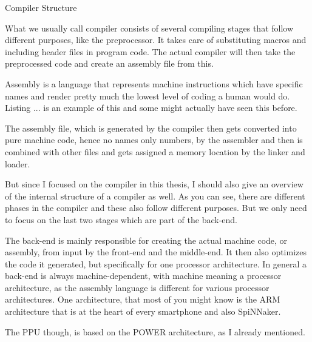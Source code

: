 \documentclass[10pt,aspectratio=169]{beamer}
\begin{document}
\begin{frame}[fragile]{Compiler Structure}
{		What we usually call compiler consists of several compiling stages that follow different purposes, like the preprocessor.
		It takes care of substituting macros and including header files in program code.
		The actual compiler will then take the preprocessed code and create an assembly file from this.

		Assembly is a language that represents machine instructions which have specific names and render pretty much the lowest level of coding a human would do.
		Listing ... is an example of this and some might actually have seen this before.

		The assembly file, which is generated by the compiler then gets converted into pure machine code, hence no names only numbers, by the assembler and then is combined with other files and gets assigned a memory location by the linker and loader.
		
		But since I focused on the compiler in this thesis, I should also give an overview of the internal structure of a compiler as well.
		As you can see, there are different phases in the compiler and these also follow different purposes.
		But we only need to focus on the last two stages which are part of the back-end.
		
		The back-end is mainly responsible for creating the actual machine code, or assembly, from input by the front-end and the middle-end.
		It then also optimizes the code it generated, but specifically for one processor architecture.
		In general a back-end is always machine-dependent, with machine meaning a processor architecture, as the assembly language is different for various processor architectures.
		One architecture, that most of you might know is the ARM architecture that is at the heart of every smartphone and also SpiNNaker.

	The PPU though, is based on the POWER architecture, as I already mentioned.}
\end{frame}
\end{document}
